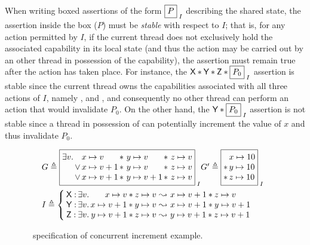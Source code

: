 When writing boxed assertions of the form $\shared{P}{I}$ describing the shared state, the assertion inside the box ($P$) must be \emph{stable} with respect to $I$; that is, for any action permitted by $I$, if the current thread does not exclusively hold the associated capability in its local state (and thus the action may be carried out by an other thread in possession of the capability), the assertion must remain true after the action has taken place. For instance, the $\token{X} * \token{Y} * \token{Z} * \shared{P_0}{I}$ assertion is stable since the current thread owns the capabilities associated with all three actions of $I$, namely ,  and , and consequently no other thread can perform an action that would invalidate $P_0$. On the other hand, the $\token{Y} * \shared{P_0}{I}$ assertion is not stable since a thread in possession of  can potentially increment the value of $x$ and thus invalidate $P_0$.
%
%
\begin{figure}
\noindent\makebox[\linewidth]{\rule{\linewidth}{1pt}}
%
\[
\begin{array}{l }
	\hspace*{-0.2cm}
	G \eqdef 
	\shared{
		\begin{array}{@{}l@{}l@{\,}l@{\,}l@{\,}l@{}}
			\exsts{v}   &  & \cell{x}{v}   & *\ \cell{y}{v}  & *\ \cell{z}{v}\\
			& \lor &  \cell{x}{v+1}   & *\ \cell{y}{v}  &*\ \cell{z}{v}\\
			&\lor &  \cell{x}{v+1}   & *\ \cell{y}{v+1}   & *\ \cell{z}{v}
		\end{array}	
				
	}{I}
	
	G' \eqdef 	
	\shared{
		\begin{array}{@{}l@{\,}l@{}}
			  &\cell{x}{10} \\
			* &\cell{y}{10}\\
			* &\cell{z}{10}\\
		\end{array}	
	}{I}
	
	\vspace*{5pt}\\
	

	\hspace*{-0.2cm}
	I \eqdef \left\{
		\hspace*{-0.1cm} 
		\begin{array}{l@{\,}l@{}r@{\ }c@{\ }l}
			\textsf{X}: & \exsts{v} & \cell{x}{v} * \cell{z}{v} & \swap & \cell{x}{v+1} * \cell{z}{v}\\
			\textsf{Y}: & \exsts{v} & \cell{x}{v+1} * \cell{y}{v} & \swap & \cell{x}{v+1} * \cell{y}{v+1}\\
			\textsf{Z}: & \exsts{v} & \cell{y}{v+1} * \cell{z}{v} & \swap & \cell{y}{v+1} * \cell{z}{v+1}\\
		\end{array}			
	
	\right.

\end{array} 
\]
%
\noindent\makebox[\linewidth]{\rule{\linewidth}{1pt}}
\caption{\colosl\ specification of concurrent increment example.}
\label{fig:concurrentIncCoLoSLSpec}
\end{figure} 
%
%

